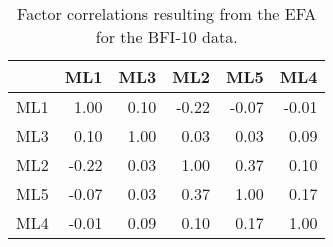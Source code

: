 \begin{table}[ht]
\centering
\begin{tabular}{rrrrrr}
  \toprule
 & {\textbf{ML1}} & {\textbf{ML3}} & {\textbf{ML2}} & {\textbf{ML5}} & {\textbf{ML4}} \\ 
  \midrule
ML1 & 1.00 & 0.10 & -0.22 & -0.07 & -0.01 \\ 
  ML3 & 0.10 & 1.00 & 0.03 & 0.03 & 0.09 \\ 
  ML2 & -0.22 & 0.03 & 1.00 & 0.37 & 0.10 \\ 
  ML5 & -0.07 & 0.03 & 0.37 & 1.00 & 0.17 \\ 
  ML4 & -0.01 & 0.09 & 0.10 & 0.17 & 1.00 \\ 
   \bottomrule
\end{tabular}
\caption{Factor correlations resulting from the EFA for the BFI-10 data.} 
\label{tab:corrsbfi10}
\end{table}
